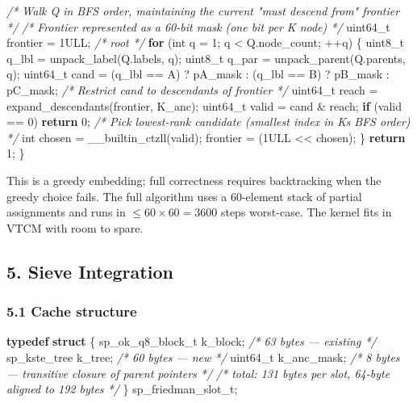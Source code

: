 \documentclass[
  11pt,
]{article}
\newenvironment{Shaded}{}{}
\newcommand{\BuiltInTok}[1]{#1}
\newcommand{\CommentTok}[1]{\textcolor[rgb]{0.38,0.63,0.69}{\textit{#1}}}
\newcommand{\ControlFlowTok}[1]{\textcolor[rgb]{0.00,0.44,0.13}{\textbf{#1}}}
\newcommand{\DataTypeTok}[1]{\textcolor[rgb]{0.56,0.13,0.00}{#1}}
\newcommand{\DecValTok}[1]{\textcolor[rgb]{0.25,0.63,0.44}{#1}}
\newcommand{\KeywordTok}[1]{\textcolor[rgb]{0.00,0.44,0.13}{\textbf{#1}}}
\newcommand{\NormalTok}[1]{#1}
\begin{document}
\begin{Shaded}
\begin{Highlighting}[]
    \CommentTok{/* Walk Q in BFS order, maintaining the current "must descend from" frontier */}
    \CommentTok{/* Frontier represented as a 60{-}bit mask (one bit per K node) */}
    \DataTypeTok{uint64\_t}\NormalTok{ frontier = }\DecValTok{1}\BuiltInTok{ULL}\NormalTok{;   }\CommentTok{/* root */}
    \ControlFlowTok{for}\NormalTok{ (}\DataTypeTok{int}\NormalTok{ q = }\DecValTok{1}\NormalTok{; q \textless{} Q.node\_count; ++q) \{}
        \DataTypeTok{uint8\_t}\NormalTok{ q\_lbl   = unpack\_label(Q.labels, q);}
        \DataTypeTok{uint8\_t}\NormalTok{ q\_par   = unpack\_parent(Q.parents, q);}
        \DataTypeTok{uint64\_t}\NormalTok{ cand   = (q\_lbl == A) ? pA\_mask : (q\_lbl == B) ? pB\_mask : pC\_mask;}
        \CommentTok{/* Restrict cand to descendants of frontier */}
        \DataTypeTok{uint64\_t}\NormalTok{ reach  = expand\_descendants(frontier, K\_anc);}
        \DataTypeTok{uint64\_t}\NormalTok{ valid  = cand \& reach;}
        \ControlFlowTok{if}\NormalTok{ (valid == }\DecValTok{0}\NormalTok{) }\ControlFlowTok{return} \DecValTok{0}\NormalTok{;}
        \CommentTok{/* Pick lowest{-}rank candidate (smallest index in K\textquotesingle{}s BFS order) */}
        \DataTypeTok{int}\NormalTok{ chosen      = \_\_builtin\_ctzll(valid);}
\NormalTok{        frontier        = (}\DecValTok{1}\BuiltInTok{ULL}\NormalTok{ \textless{}\textless{} chosen);}
\NormalTok{    \}}
    \ControlFlowTok{return} \DecValTok{1}\NormalTok{;}
\NormalTok{\}}
\end{Highlighting}
\end{Shaded}

This is a greedy embedding; full correctness requires backtracking when
the greedy choice fails. The full algorithm uses a 60-element stack of
partial assignments and runs in \(\le 60 \times 60 = 3600\) steps
worst-case. The kernel fits in VTCM with room to spare.

\hypertarget{sieve-integration}{%
\subsection{5. Sieve Integration}\label{sieve-integration}}

\hypertarget{cache-structure}{%
\subsubsection{5.1 Cache structure}\label{cache-structure}}

\begin{Shaded}
\begin{Highlighting}[]
\KeywordTok{typedef} \KeywordTok{struct}\NormalTok{ \{}
\NormalTok{    sp\_ok\_q8\_block\_t k\_block;     }\CommentTok{/* 63 bytes — existing */}
\NormalTok{    sp\_kste\_tree     k\_tree;      }\CommentTok{/* 60 bytes — new */}
    \DataTypeTok{uint64\_t}\NormalTok{         k\_anc\_mask;  }\CommentTok{/* 8 bytes — transitive closure of parent pointers */}
    \CommentTok{/* total: 131 bytes per slot, 64{-}byte aligned to 192 bytes */}
\NormalTok{\} sp\_friedman\_slot\_t;}
\end{Highlighting}
\end{Shaded}
\end{document}
